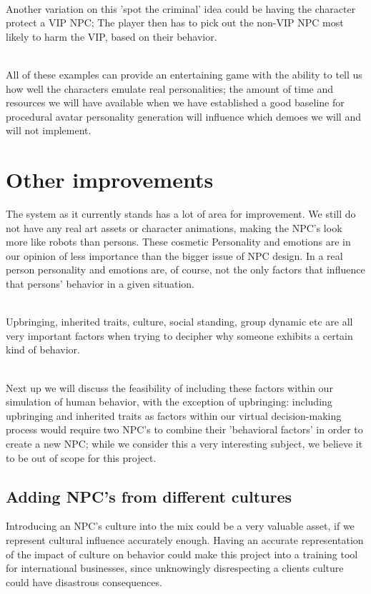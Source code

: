 \documentclass[11pt]{article} %
\begin{document}
~\\
Another variation on this 'spot the criminal'  idea could be having the character protect a VIP NPC; The player then has to pick out the non-VIP NPC most likely to harm the VIP, based on their behavior. 

~\\
All of these examples can provide an entertaining game with the ability to tell us how well the characters emulate real personalities; the amount of time and resources we will have available when we have established a good baseline for procedural avatar personality generation will influence which demoes we will and will not implement.



\newpage
\section{Other improvements}
The system as it currently stands has a lot of area for improvement. We still do not have any real art assets or character animations, making the NPC's look more like robots than persons. These cosmetic Personality and emotions are in our opinion of less importance than the bigger issue of NPC design. In a real person personality and emotions are, of course, not the only factors that influence that persons' behavior in a given situation. 


~\\
Upbringing, inherited traits, culture, social standing, group dynamic etc are all very important factors when trying to decipher why someone exhibits a certain kind of behavior.

~\\
Next up we will discuss the feasibility of including these factors within our simulation of human behavior, with the exception of upbringing:
including upbringing and inherited traits as factors within our virtual decision-making process would require two NPC's to combine their 'behavioral factors' in order to create a new NPC; while we consider this a very interesting subject, we believe it to be out of scope for this project. 

\newpage
\subsection{Adding NPC's from different cultures}
Introducing an NPC's culture into the mix could be a very valuable asset, if we represent cultural influence accurately enough. Having an accurate representation of the impact of culture on behavior could make this project into a training tool for international businesses, since unknowingly disrespecting a clients culture could have disastrous consequences.
\end{document}
